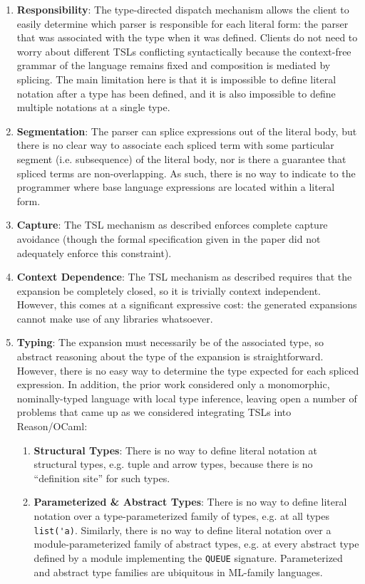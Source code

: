 \documentclass[acmsmall,review,anonymous]{acmart}\settopmatter{printfolios=true,printccs=false,printacmref=false}
\newcommand{\li}[1]{\lstinline[basicstyle=\ttfamily\fontsize{9pt}{1em}\selectfont]{#1}}
\begin{document}
\begin{enumerate}[leftmargin=12px]
  \item[\LEFTcircle] \textbf{Responsibility}: The type-directed dispatch mechanism allows the client to easily determine which parser is responsible for each literal form: the parser that was associated with the type when it was defined. Clients do not need to worry about different TSLs conflicting syntactically because the context-free grammar of the language remains fixed and composition is mediated by splicing. The main limitation here is that it is impossible to define literal notation after a type has been defined, and it is also impossible to define multiple notations at a single type.
  \item[\LEFTcircle] \textbf{Segmentation}: The parser can splice expressions out of the literal body, but there is no clear way to associate each spliced term with some particular segment (i.e. subsequence) of the literal body, nor is there a guarantee that spliced terms are non-overlapping. As such, there is no way to indicate to the programmer where base language expressions are located within a literal form.
  \item[\LEFTcircle] \textbf{Capture}: The TSL mechanism as described enforces complete capture avoidance (though the formal specification given in the paper did not adequately enforce this constraint).
  \item[\LEFTcircle] \textbf{Context Dependence}: The TSL mechanism as described requires that the expansion be completely closed, so it is trivially context independent. However, this comes at a significant expressive cost: the generated expansions cannot make use of any libraries whatsoever.
  \item[\LEFTcircle] \textbf{Typing}: The expansion must necessarily be of the associated type, so abstract reasoning about the type of the expansion is straightforward. However, there is no easy way to determine the type expected for each spliced expression. In addition, the prior work considered only a monomorphic, nominally-typed language with local type inference, leaving open a number of problems that came up as we considered integrating TSLs into Reason/OCaml:
\begin{enumerate}[leftmargin=15px,nolistsep,noitemsep]
  \item \textbf{Structural Types}: There is no way to define literal notation at structural types, e.g. tuple and arrow types, because there is no ``definition site'' for such types.
  \item \textbf{Parameterized \& Abstract Types}: There is no way to define literal notation over a type-parameterized family of types, e.g. at all types \li{list('a)}. Similarly, there is no way to define literal notation over a module-parameterized family of abstract types, e.g. at every abstract type defined by a module implementing the \li{QUEUE} signature. Parameterized and abstract type families are ubiquitous in ML-family languages.%

\end{enumerate}
\end{enumerate}
\end{document}
